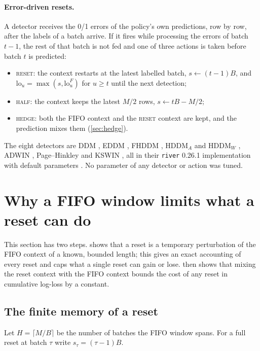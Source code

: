 \documentclass[10pt]{article}
\theoremstyle{definition}
\theoremstyle{remark}
\newcommand{\full}{\textup{\textsc{reset}}}
\newcommand{\half}{\textup{\textsc{half}}}
\newcommand{\hedge}{\textup{\textsc{hedge}}}
\begin{document}
\paragraph{Error-driven resets.}
A detector receives the 0/1 errors of the policy's own predictions, row by row, after the labels of a batch arrive.
If it fires while processing the errors of batch $t-1$, the rest of that batch is not fed and one of three actions is
taken before batch $t$ is predicted:
\begin{itemize}
\item \full: the context restarts at the latest labelled batch, $s\gets (t-1)B$, and $\mathrm{lo}_u=\max(s,\mathrm{lo}^F_u)$
  for $u\ge t$ until the next detection;
\item \half: the context keeps the latest $M/2$ rows, $s\gets tB-M/2$;
\item \hedge: both the FIFO context and the \full{} context are kept, and the prediction mixes them
  (\cref{sec:hedge}).
\end{itemize}
The eight detectors are DDM \citep{gama2004ddm}, EDDM \citep{baena2006eddm}, FHDDM \citep{pesaranghader2016fhddm},
HDDM$_A$ and HDDM$_W$ \citep{frias2015hddm}, ADWIN \citep{bifet2007adwin}, Page--Hinkley \citep{page1954ph} and KSWIN
\citep{raab2020kswin}, all in their \texttt{river} 0.26.1 implementation with default parameters
\citep{montiel2021river}. No parameter of any detector or action was tuned.

\section{Why a FIFO window limits what a reset can do}
\label{sec:theory}

This section has two steps.  shows that a reset is a temporary perturbation of the FIFO context of a
known, bounded length; this gives an exact accounting of every reset and caps what a single reset can gain or lose.
 then shows that mixing the reset context with the FIFO context bounds the cost of any reset in
cumulative log-loss by a constant.

\subsection{The finite memory of a reset}

Let $H=\lceil M/B\rceil$ be the number of batches the FIFO window spans. For a full reset at batch $\tau$ write
$s_\tau=(\tau-1)B$.
\end{document}
